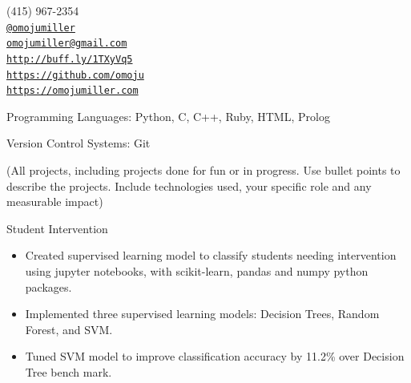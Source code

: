 \documentclass[11pt,article,oneside]{memoir}
\makeatletter
\def\myemail{omojumiller@gmail.com}
\def\myweb{https://omojumiller.com}
\def\myphone{(415) 967-2354}
\def\mytwitter{@omojumiller}
\def\mylinkedin{http://buff.ly/1TXyVq5}
\def\mygithub{https://github.com/omoju}
\makeatother
\begin{document}
\begin{minipage}[t]{2.95in}
  
\end{minipage}
\hfill     
\hfill
\begin{minipage}[t]{1.3in}
  \flushright \footnotesize  \addressblock \myphone \, \faPhone \\ 
  {\scriptsize  \texttt{\href{http://twitter.com/omojumiller}{\mytwitter}} \, \faTwitter }  \\ 
  {\scriptsize  \texttt{\href{mailto:\myemail}{\myemail}} \, \faEnvelope} \\
  {\scriptsize  \texttt{\href{\mylinkedin}{\mylinkedin}} \, \faLinkedin} \\
  {\scriptsize  \texttt{\href{\mygithub}{\mygithub}} \, \faGithub} \\
  {\scriptsize  \texttt{\href{\myweb}{\myweb}} \, \faGlobe}
\end{minipage}

\medskip

\reversemarginpar

\bigskip       

\medskip

\ind Programming Languages: Python, C, C++, Ruby, HTML, Prolog

\ind Version Control Systems: Git

\bigskip 

\medskip

\ind (All projects, including projects done for fun or in progress. Use bullet points to describe the projects. Include technologies used, your specific role and any measurable impact)

\ind Student Intervention
\begin{itemize}
\item Created supervised learning model to classify students needing intervention using jupyter notebooks, with scikit-learn, pandas and numpy python packages.
\item Implemented three supervised learning models: Decision Trees, Random Forest, and SVM.
\item Tuned SVM model to improve classification accuracy by 11.2\% over Decision Tree bench mark.
\end{itemize} 
\end{document}
